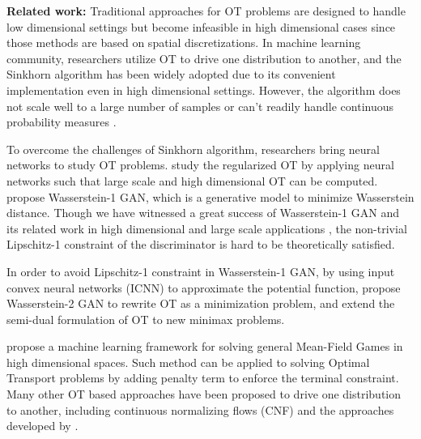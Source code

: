 \documentclass{article}
\newcommand{\zha}[1]{{\color{red} Zha: #1}}
\begin{document}
\textbf{Related work:}
Traditional approaches \citep{benamou2,benamou1,parallelot,unnormot} for OT problems are designed to handle low dimensional settings but become infeasible in high dimensional cases since those methods are based on spatial discretizations. In machine learning community, researchers utilize OT to drive one distribution to another, and the Sinkhorn algorithm has been widely adopted \citep{lineartimeotsinkhorn, genwithsinkhorn, otmatch, ipot} due to its convenient implementation even in high dimensional settings. 
However, the algorithm does not scale well to a large number of samples or can't readily handle continuous probability measures \citep{soptilargescaleot}. 

To overcome the challenges of Sinkhorn algorithm, researchers bring neural networks to study OT problems. \citet{largeot} study the regularized OT by applying neural networks such that large scale and high dimensional OT can be computed. \citet{wgan} propose Wasserstein-1 GAN, which is a generative model to minimize Wasserstein distance. Though we have witnessed a great success of Wasserstein-1 GAN and its related work in high dimensional and large scale applications \citep{gulrajani2017improved, wasserautoencoder, spectral, wassproximalofgan, wofwforgen, scalsot}, the non-trivial Lipschitz-1 constraint of the discriminator is hard to be theoretically satisfied.

In order to avoid Lipschitz-1 constraint in Wasserstein-1 GAN, by using input convex neural networks (ICNN) \citep{icnn} to approximate the potential function, \citet{wasserstein2gan} propose Wasserstein-2 GAN to rewrite OT as a minimization problem, \citet{icnnwasserbary} and \citet{icnnot} extend the semi-dual formulation of OT to new minimax problems. 

\citet{ruthotto2020machine} propose a machine learning framework for solving general Mean-Field Games in high dimensional spaces. Such method can be applied to solving Optimal Transport problems by adding penalty term to enforce the terminal constraint. Many other OT based approaches have been proposed to drive one distribution to another, including continuous normalizing flows (CNF) \citep{cnf1, cnf2} and the approaches developed by \citet{tabak1, tabak2}. 
\end{document}
